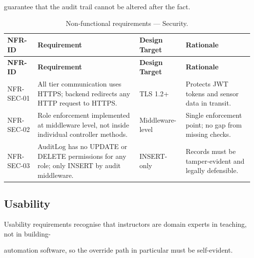 guarantee that the audit trail cannot be altered after the fact.

\begin{longtable}{|L{2.5cm}|L{5.0cm}|L{3.2cm}|L{4.0cm}|}
	\caption{Non-functional requirements --- Security.} \label{tab:3-18}                                                                                                                            \\
	\hline
	\textbf{NFR-ID} & \textbf{Requirement}                                                                        & \textbf{Design Target} & \textbf{Rationale}                                     \\
	\hline
	\endfirsthead
	\hline
	\textbf{NFR-ID} & \textbf{Requirement}                                                                        & \textbf{Design Target} & \textbf{Rationale}                                     \\
	\hline
	\endhead
	\hline
	\endfoot
	\hline
	\endlastfoot
	NFR-SEC-01      & All tier communication uses HTTPS; backend redirects any HTTP request to HTTPS.             & TLS 1.2+               & Protects JWT tokens and sensor data in transit.        \\
	\hline
	NFR-SEC-02      & Role enforcement implemented at middleware level, not inside individual controller methods. & Middleware-level       & Single enforcement point; no gap from missing checks.  \\
	\hline
	NFR-SEC-03      & AuditLog has no UPDATE or DELETE permissions for any role; only INSERT by audit middleware. & INSERT-only            & Records must be tamper-evident and legally defensible. \\
	\hline
\end{longtable}


\subsection{Usability}
Usability requirements recognise that instructors are domain experts in teaching, not in building-

automation software, so the override path in particular must be self-evident.

